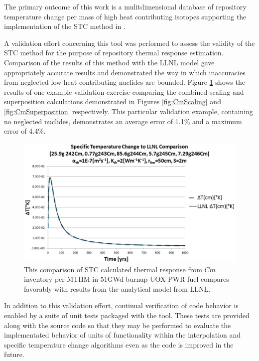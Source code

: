 
The primary outcome of this work is a mulitdimensional database of repository temperature 
change per mass of high heat contributing isotopes supporting the implementation 
of the \gls{STC} method in \Cyder. 

A validation effort concerning this tool was performed to assess the validity of 
the \gls{STC} method for the purpose of repository thermal response estimation.  
Comparison of the results of this method with the \gls{LLNL} model 
\cite{greenberg_application_2012} gave 
appropriately accurate results and demonstrated the way in which inaccuracies 
from neglected low heat contributing nuclides are bounded. Figure 
\ref{fig:CmValidation} shows the results of one example validation exercise 
comparing the combined scaling and  superposition calculations demonstrated in 
Figures \ref{fig:CmScaling} and \ref{fig:CmSuperposition} respectively. This 
particular validation example, containing no neglected nuclides, demonstrates 
an average error of 1.1\% and a maximum error of 4.4\%.

\begin{figure}[htp!]
\begin{center}
\includegraphics[width=\columnwidth]{./chapters/methodology/thermal_models/CmValidation.eps}
\end{center}
\caption{This comparison of \gls{STC} calculated thermal response from $Cm$ 
inventory per MTHM in 51GWd burnup UOX PWR fuel compares favorably with results 
from the analytical model from LLNL.} 
\label{fig:CmValidation}
\end{figure}

In addition to this validation effort, continual verification of code behavior 
is enabled by a suite of unit tests packaged with the tool. These tests are 
provided along with the source code so that they may be performed to evaluate 
the implementated behavior of units of functionality within the interpolation 
and specific temperature change algorithms even as the code is improved in the 
future.  
